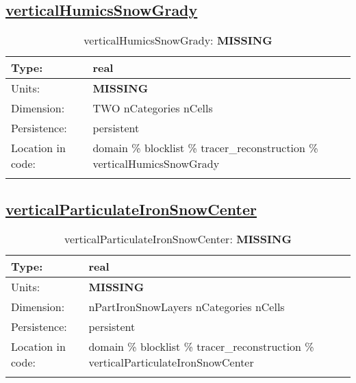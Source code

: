 \subsection[verticalHumicsSnowGrady]{\hyperref[sec:var_tab_tracer_reconstruction]{verticalHumicsSnowGrady}}
\label{subsec:var_sec_tracer_reconstruction_verticalHumicsSnowGrady}
\begin{center}
\begin{longtable}{| p{2.0in} | p{4.0in} |}
        \hline 
        Type: & real \\
        \hline 
        Units: & {\bf \color{red} MISSING} \\
        \hline 
        Dimension: & TWO nCategories nCells \\
        \hline 
        Persistence: & persistent \\
        \hline 
         Location in code: & domain \% blocklist \% tracer\_reconstruction \% verticalHumicsSnowGrady \\
         \hline 
    \caption{verticalHumicsSnowGrady: {\bf \color{red} MISSING}}
\end{longtable}
\end{center}
\subsection[verticalParticulateIronSnowCenter]{\hyperref[sec:var_tab_tracer_reconstruction]{verticalParticulateIronSnowCenter}}
\label{subsec:var_sec_tracer_reconstruction_verticalParticulateIronSnowCenter}
\begin{center}
\begin{longtable}{| p{2.0in} | p{4.0in} |}
        \hline 
        Type: & real \\
        \hline 
        Units: & {\bf \color{red} MISSING} \\
        \hline 
        Dimension: & nPartIronSnowLayers nCategories nCells \\
        \hline 
        Persistence: & persistent \\
        \hline 
         Location in code: & domain \% blocklist \% tracer\_reconstruction \% verticalParticulateIronSnowCenter \\
         \hline 
    \caption{verticalParticulateIronSnowCenter: {\bf \color{red} MISSING}}
\end{longtable}
\end{center}

